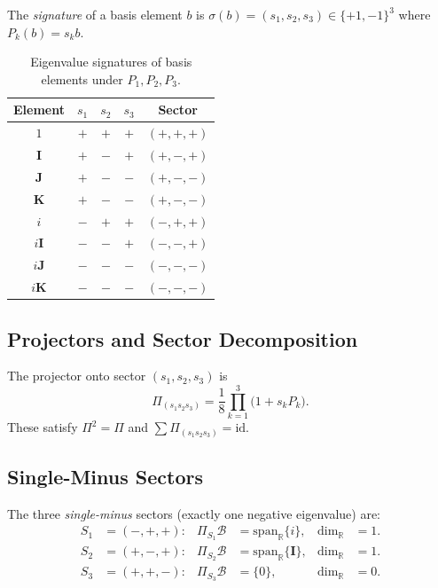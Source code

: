 The \emph{signature} of a basis element $b$ is
$\sigma(b) = (s_1, s_2, s_3) \in \{+1,-1\}^3$ where $P_k(b) = s_k b$.

\begin{table}[h]
  \centering
  \caption{Eigenvalue signatures of basis elements under $P_1, P_2, P_3$.}
  \label{tab:inv:signatures}
  \begin{tabular}{ccccc}
    \hline
    Element & $s_1$ & $s_2$ & $s_3$ & Sector \\
    \hline
    $1$         & $+$ & $+$ & $+$ & $(+,+,+)$ \\
    $\mathbf{I}$ & $+$ & $-$ & $+$ & $(+,-,+)$ \\
    $\mathbf{J}$ & $+$ & $-$ & $-$ & $(+,-,-)$ \\
    $\mathbf{K}$ & $+$ & $-$ & $-$ & $(+,-,-)$ \\
    $i$          & $-$ & $+$ & $+$ & $(-,+,+)$ \\
    $i\mathbf{I}$ & $-$ & $-$ & $+$ & $(-,-,+)$ \\
    $i\mathbf{J}$ & $-$ & $-$ & $-$ & $(-,-,-)$ \\
    $i\mathbf{K}$ & $-$ & $-$ & $-$ & $(-,-,-)$ \\
    \hline
  \end{tabular}
\end{table}

\subsection{Projectors and Sector Decomposition}

The projector onto sector $(s_1, s_2, s_3)$ is
\begin{equation}
  \Pi_{(s_1 s_2 s_3)} = \frac{1}{8}
  \prod_{k=1}^{3}\bigl(1 + s_k P_k\bigr).
  \label{eq:inv:projector}
\end{equation}
These satisfy $\Pi^2 = \Pi$ and $\sum \Pi_{(s_1 s_2 s_3)} = \mathrm{id}$.

\subsection{Single-Minus Sectors}
\label{subsec:inv:single_minus}

The three \emph{single-minus} sectors (exactly one negative eigenvalue) are:
\begin{align}
  S_1 &= (-,+,+): & \Pi_{S_1}\mathcal{B} &= \mathrm{span}_\mathbb{R}\{i\},
    & \dim_\mathbb{R} &= 1. \\
  S_2 &= (+,-,+): & \Pi_{S_2}\mathcal{B} &= \mathrm{span}_\mathbb{R}\{\mathbf{I}\},
    & \dim_\mathbb{R} &= 1. \\
  S_3 &= (+,+,-): & \Pi_{S_3}\mathcal{B} &= \{0\},
    & \dim_\mathbb{R} &= 0.
  \label{eq:inv:S3_empty}
\end{align}

